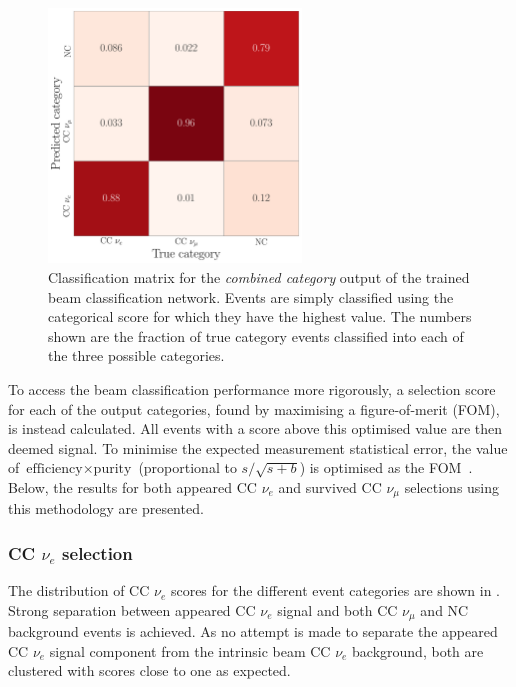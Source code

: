 \begin{figure} %
    \includegraphics[width=0.6\textwidth]{diagrams/7-results/final_comb_cat_confusion.pdf}
    \caption[Classification matrix for the combined category output of the beam classification
        network] {Classification matrix for the \emph{combined category} output of the trained
        beam classification network. Events are simply classified using the categorical score for
        which they have the highest value. The numbers shown are the fraction of true category
        events classified into each of the three possible categories.}
    \label{fig:final_comb_cat_confusion}
\end{figure}

To access the beam classification performance more rigorously, a selection score for each of the
output categories, found by maximising a figure-of-merit (FOM), is instead calculated. All events
with a score above this optimised value are then deemed signal. To minimise the expected
measurement statistical error, the value of $\text{efficiency}\times\text{purity}$ (proportional
to $s/\sqrt{s+b}$) is optimised as the FOM~\cite{list2002}. Below, the results for both appeared
CC $\nu_{e}$ and survived CC $\nu_{\mu}$ selections using this methodology are presented.

\subsubsection*{CC $\nu_{e}$ selection} %

The distribution of CC $\nu_{e}$ scores for the different event categories are shown in
. Strong separation between appeared CC $\nu_{e}$ signal
and both CC $\nu_{\mu}$ and NC background events is achieved. As no attempt is made to separate
the appeared CC $\nu_{e}$ signal component from the intrinsic beam CC $\nu_{e}$ background, both
are clustered with scores close to one as expected.

